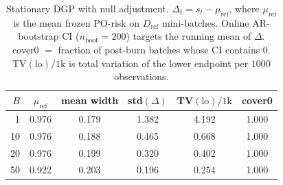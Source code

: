 \begin{table}[ht]
\centering
\caption{Stationary DGP with null adjustment. $\Delta_t=s_t-\mu_{\mathrm{ref}}$, where $\mu_{\mathrm{ref}}$ is the mean frozen PO-risk on $D_{\mathrm{ref}}$ mini-batches. Online AR-bootstrap CI ($n_{\mathrm{boot}}=200$) targets the running mean of $\Delta$. cover0 $=$ fraction of post-burn batches whose CI contains $0$. TV$(\mathrm{lo})/1\mathrm{k}$ is total variation of the lower endpoint per $1000$ observations.}
\label{tab:stationary-batchsize-boot-ci}
\small
\begin{tabular}{@{}r ccccc@{}}
\toprule
$B$ & $\mu_{\mathrm{ref}}$ & mean width & std$(\Delta)$ & TV$(\mathrm{lo})/1\mathrm{k}$ & cover0 \\
\midrule
1 & 0.976 & 0.179 & 1.382 & 4.192 & 1.000 \\
10 & 0.976 & 0.188 & 0.465 & 0.668 & 1.000 \\
20 & 0.976 & 0.199 & 0.320 & 0.402 & 1.000 \\
50 & 0.922 & 0.203 & 0.196 & 0.254 & 1.000 \\
\bottomrule
\end{tabular}
\end{table}
